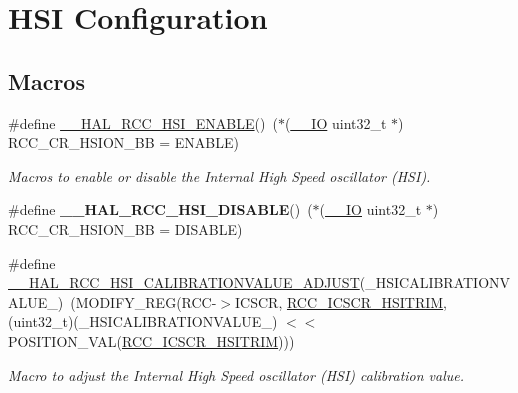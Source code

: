 \hypertarget{group___r_c_c___h_s_i___configuration}{\section{H\-S\-I Configuration}
\label{group___r_c_c___h_s_i___configuration}
}
\subsection*{Macros}
\begin{DoxyCompactItemize}
\item 
\#define \hyperlink{group___r_c_c___h_s_i___configuration_gaab944f562b53fc74bcc0e4958388fd42}{\-\_\-\-\_\-\-H\-A\-L\-\_\-\-R\-C\-C\-\_\-\-H\-S\-I\-\_\-\-E\-N\-A\-B\-L\-E}()~($\ast$(\hyperlink{core__sc300_8h_aec43007d9998a0a0e01faede4133d6be}{\-\_\-\-\_\-\-I\-O} uint32\-\_\-t $\ast$) R\-C\-C\-\_\-\-C\-R\-\_\-\-H\-S\-I\-O\-N\-\_\-\-B\-B = E\-N\-A\-B\-L\-E)
\begin{DoxyCompactList}\small\item\em Macros to enable or disable the Internal High Speed oscillator (H\-S\-I). \end{DoxyCompactList}\item 
\hypertarget{group___r_c_c___h_s_i___configuration_ga0c0dc8bc0ef58703782f45b4e487c031}{\#define {\bfseries \-\_\-\-\_\-\-H\-A\-L\-\_\-\-R\-C\-C\-\_\-\-H\-S\-I\-\_\-\-D\-I\-S\-A\-B\-L\-E}()~($\ast$(\hyperlink{core__sc300_8h_aec43007d9998a0a0e01faede4133d6be}{\-\_\-\-\_\-\-I\-O} uint32\-\_\-t $\ast$) R\-C\-C\-\_\-\-C\-R\-\_\-\-H\-S\-I\-O\-N\-\_\-\-B\-B = D\-I\-S\-A\-B\-L\-E)}\label{group___r_c_c___h_s_i___configuration_ga0c0dc8bc0ef58703782f45b4e487c031}

\item 
\#define \hyperlink{group___r_c_c___h_s_i___configuration_ga36991d340af7ad14b79f204c748b0e3e}{\-\_\-\-\_\-\-H\-A\-L\-\_\-\-R\-C\-C\-\_\-\-H\-S\-I\-\_\-\-C\-A\-L\-I\-B\-R\-A\-T\-I\-O\-N\-V\-A\-L\-U\-E\-\_\-\-A\-D\-J\-U\-S\-T}(\-\_\-\-H\-S\-I\-C\-A\-L\-I\-B\-R\-A\-T\-I\-O\-N\-V\-A\-L\-U\-E\-\_\-)~(M\-O\-D\-I\-F\-Y\-\_\-\-R\-E\-G(R\-C\-C-\/$>$I\-C\-S\-C\-R, \hyperlink{group___peripheral___registers___bits___definition_gab79c333962d5bd80636eca9997759804}{R\-C\-C\-\_\-\-I\-C\-S\-C\-R\-\_\-\-H\-S\-I\-T\-R\-I\-M}, (uint32\-\_\-t)(\-\_\-\-H\-S\-I\-C\-A\-L\-I\-B\-R\-A\-T\-I\-O\-N\-V\-A\-L\-U\-E\-\_\-) $<$$<$ P\-O\-S\-I\-T\-I\-O\-N\-\_\-\-V\-A\-L(\hyperlink{group___peripheral___registers___bits___definition_gab79c333962d5bd80636eca9997759804}{R\-C\-C\-\_\-\-I\-C\-S\-C\-R\-\_\-\-H\-S\-I\-T\-R\-I\-M})))
\begin{DoxyCompactList}\small\item\em Macro to adjust the Internal High Speed oscillator (H\-S\-I) calibration value. \end{DoxyCompactList}\end{DoxyCompactItemize}


